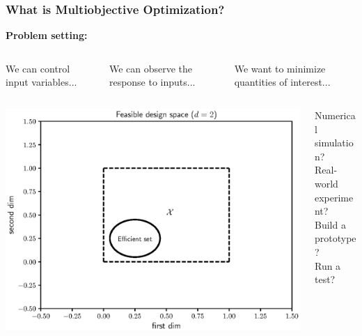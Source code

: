 \documentclass[aspectratio=169]{beamer}
\begin{document}
\begin{frame}\frametitle{What is Multiobjective Optimization?}
{\bf Problem setting:}\\
\medskip
\begin{columns}
\begin{column}{.3\textwidth}
We can control input variables...
\end{column}
\begin{column}{.25\textwidth}
We can observe the response to inputs...
\end{column}
\begin{column}{.3\textwidth}
We want to minimize quantities of interest...
\end{column}
\end{columns}
\begin{columns}
\begin{column}{.35\textwidth}
\includegraphics[width=\textwidth]{feasible_design.eps}
\end{column}
\begin{column}{.2\textwidth}
\begin{center}
{\scriptsize
Numerical simulation?\\
Real-world experiment?\\
Build a prototype?\\
Run a test?\\
}
\end{center}
\end{column}
\end{columns}
\end{frame}
\end{document}
